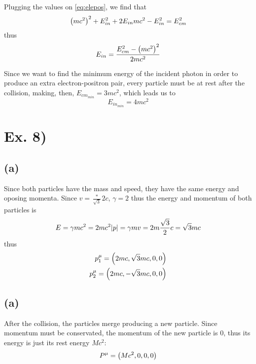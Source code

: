 \documentclass[oneside, 10pt, notitlepage]{book}
\begin{document}
Plugging the values on \eqref{eq:elepos}, we find that 
\begin{equation}
    \left(mc^2\right)^2 + E_{in}^2 + 2 E_{in}mc^2 - E_{in}^2 = E_{cm}^2
\end{equation}
thus 
\begin{equation}
    E_{in} = \frac{E_{cm}^2 - \left(mc^2\right)^2}{2mc^2}
\end{equation}

Since we want to find the minimum energy of the incident photon in order to produce an extra electron-positron pair, every particle must be at rest after the collision, making, then, \(E_{cm_{min}} = 3 mc^2\), which leads us to 
\begin{equation}
    E_{in_{min}} = 4 mc^2
\end{equation}


\section*{Ex. 8)}
\subsection*{(a)}

Since both particles have the mass and speed, they have the same energy and oposing momenta. Since \(v = \frac*{\sqrt{3}}{2}c\), \(\gamma=2\) thus the energy and momentum of both particles is 
\begin{equation}
    E = \gamma m c^2 = 2 m c^2
    \abs{p} = \gamma m v = 2 m \frac{\sqrt{3}}{2}c = \sqrt{3} m c
\end{equation}
thus 
\begin{equation}
\begin{split}
    p_1^{\mu} = \left(2 m c , \sqrt{3} m c , 0 , 0\right) \\
    p_2^{\mu} = \left(2 m c , -\sqrt{3} m c, 0 ,0 \right)
\end{split}
\end{equation}

\subsection*{(a)}
After the collision, the particles merge producing a new particle. Since momentum must be conservated, the momentum of the new particle is \(0\), thus its energy is just its rest energy \(Mc^2\):
\begin{equation}
    P^{\mu} = \left(Mc^2,0,0,0\right)
\end{equation}
\end{document}
